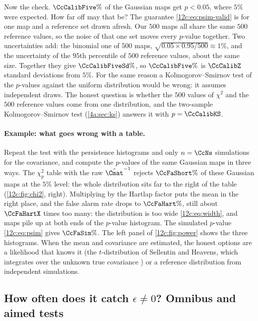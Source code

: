 Now the check. $\CcCalibFive\%$ of the Gaussian maps get $p<0.05$, where $5\%$ were expected. How far off may that be? The
guarantee \eqref{12c:eq:psim-valid} is for one map and a reference set drawn afresh. Our $500$ maps all share the same $500$
reference values, so the noise of that one set moves every $p$-value together. Two uncertainties add: the binomial one of
$500$ maps, $\sqrt{0.05\times0.95/500}\approx1\%$, and the uncertainty of the $95$th percentile of $500$ reference values, about
the same size. Together they give $\CcCalibFiveSd\%$, so $\CcCalibFive\%$ is $\CcCalibZ$ standard deviations from $5\%$. For the
same reason a Kolmogorov--Smirnov test of the $p$-values against the uniform distribution would be wrong: it assumes independent
draws. The honest question is whether the $500$ values of $\chi^2$ and the $500$ reference values come from one distribution,
and the two-sample Kolmogorov--Smirnov test (\cref{4a:sec:ks}) answers it with $p=\CcCalibKS$.

\paragraph{Example: what goes wrong with a table.} Repeat the test with the persistence histograms and only $n=\CcNs$
simulations for the covariance, and compute the $p$-values of the same Gaussian maps in three ways. The $\chi^2_p$ table
with the raw $\hat\Cmat^{-1}$ rejects $\CcFaShort\%$ of these Gaussian maps at the $5\%$ level: the whole distribution sits
far to the right of the table (\cref{12c:fig:chi2}, right). Multiplying by the Hartlap factor puts the mean in the right
place, and the false alarm rate drops to $\CcFaHart\%$, still about $\CcFaHartX$ times too many: the distribution is too wide
\eqref{12c:eq:width}, and maps pile up at both ends of the $p$-value histogram. The simulated $p$-value \eqref{12c:eq:psim}
gives $\CcFaSim\%$. The left panel of \cref{12c:fig:power} shows the three histograms. When the mean and covariance are
estimated, the honest options are a likelihood that knows it (the $t$-distribution of Sellentin and Heavens, which
integrates over the unknown true covariance \cite{SellentinHeavens2016}) or a reference distribution from independent
simulations.

\subsection{How often does it catch $\epsilon\neq0$? Omnibus and aimed tests}
\label{12c:sec:power}

